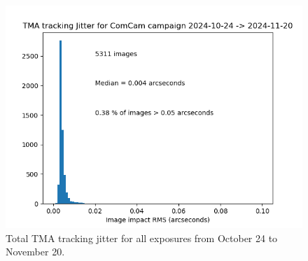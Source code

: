 \begin{figure}
  \includegraphics[width=\linewidth]{image_quality_figures/ComCam_Mount_Jitter_21Nov24.png}
  \caption{Total TMA tracking jitter for all exposures from October 24 to November 20.}
  \label{fig:jitter}
\end{figure}

